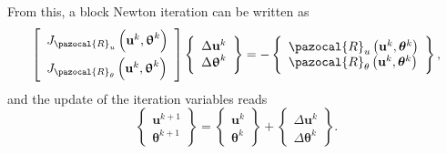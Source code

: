 From this, a block Newton iteration can be written as
\begin{equation} \label{eq:block_newton_raphson}
\left[\begin{array}{l}
J_{\pazocal{R}_{u}}\left(\mathbf u^k, \bm{\uptheta}^{k}\right) \\[7pt] J_{\pazocal{R}_{\theta}}\left(\mathbf{u}^{k}, \bm\uptheta^k\right)
\end{array}\right]
\left\{\begin{array}{c}\Delta \mathbf{u}^{k} \\ \Delta \bm{\uptheta}^{k}\end{array}\right\}
=-\left\{\begin{array}{l}\pazocal{R}_{u}\left(\mathbf{u}^{k}, \boldsymbol{\theta}^{k}\right) \\ \pazocal{R}_{\theta}\left(\mathbf{u}^{k}, \boldsymbol{\theta}^{k}\right)\end{array}\right\},
\end{equation}
and the update of the iteration variables reads
\begin{equation}
\left\{\begin{array}{l}
\mathbf{u}^{k+1} \\
\boldsymbol{\theta}^{k+1}
\end{array}\right\}=\left\{\begin{array}{l}
\mathbf{u}^{k} \\
\boldsymbol{\theta}^{k}
\end{array}\right\}+\left\{\begin{array}{c}
\Delta \mathbf{u}^{k} \\
\Delta \boldsymbol{\theta}^{k}
\end{array}\right\}.
\end{equation}


